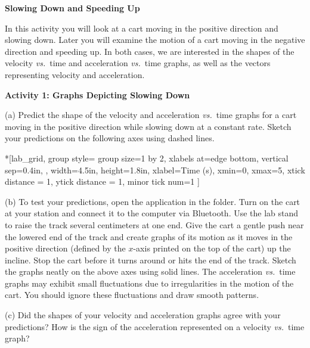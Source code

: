 \medskip
\textbf{Slowing Down and Speeding Up }

In this activity you will look at a cart moving in the positive direction and slowing down. Later you will examine the motion of a cart moving in the negative direction and speeding up. In both cases, we are interested in the shapes of the velocity \textit{vs.}~time and acceleration \textit{vs.}~time graphs, as well as the vectors representing velocity and acceleration. 

\pagebreak[2]
\textbf{Activity 1: Graphs Depicting Slowing Down} 

(a) Predict the shape of the velocity and acceleration \textit{vs.}~time graphs
for a cart moving in the positive direction while slowing down at a constant rate. Sketch your predictions on the following axes using dashed lines.

\begin{lab_groupplot}*{}[lab_grid,
	group style={
		group size=1 by 2,
		xlabels at=edge bottom,
		vertical sep=0.4in,
		},
	width=4.5in,  height=1.8in,
	xlabel=Time (s),
	xmin=0, xmax=5,
	xtick distance = 1, 
	ytick distance = 1, 
	minor tick num=1
	]
\nextgroupplot[
	ymin=-1,ymax=1, 
	ylabel={Velocity (m/s)},
	]
\nextgroupplot[
	ymin=-1,ymax=1, 
	ylabel={Acceleration (m/s$^2$)},
	]
\end{lab_groupplot}

(b) To test your predictions, open the  application in the \filename{\coursefolder} folder. Turn on the cart at your station and connect it to the computer via Bluetooth. Use the lab stand to raise the track several centimeters at one end. Give the cart a gentle push near the lowered end of the track and create graphs of its motion as it moves in the positive direction (defined by the $x$-axis printed on the top of the cart) up the incline. Stop the cart before it turns around or hits the end of the track. Sketch the graphs neatly on the above axes using solid lines. The acceleration \textit{vs.}~time graphs may exhibit small fluctuations due to irregularities in the motion of the cart. You should ignore these fluctuations and draw smooth patterns.

(c) Did the shapes of your velocity and acceleration graphs agree with your predictions? How is the sign of the acceleration represented on a velocity \textit{vs.}~time graph? 
\answerspace{15mm}

